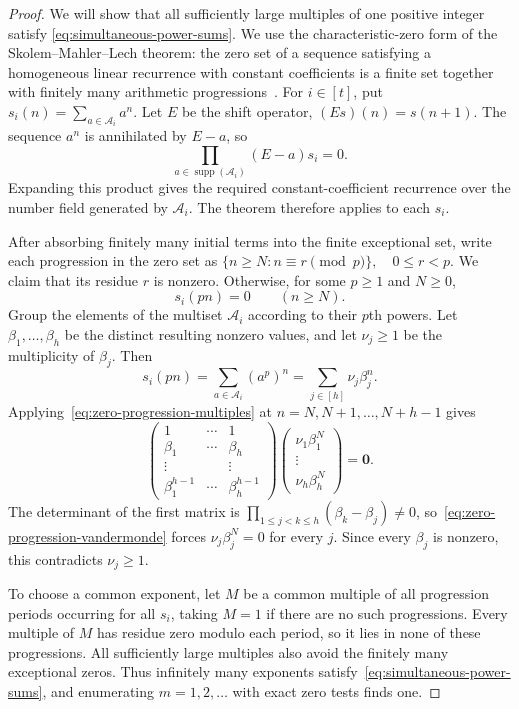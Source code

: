 \documentclass[11pt,letterpaper,onecolumn]{article}
\theoremstyle{plain}
\theoremstyle{definition}
\theoremstyle{remark}
\begin{document}
\begin{proof}
We will show that all sufficiently large multiples of one positive integer
satisfy \eqref{eq:simultaneous-power-sums}.
We use the characteristic-zero form of the Skolem--Mahler--Lech
theorem: the zero set of a sequence satisfying a homogeneous linear
recurrence with constant coefficients is a finite set together with
finitely many arithmetic progressions~\cite{Lech1953}.
For $i\in[t]$, put $s_i(n)=\sum_{a\in\mathcal A_i}a^n$.
Let $E$ be the shift operator, $(Es)(n)=s(n+1)$.  The sequence $a^n$
is annihilated by $E-a$, so
\[
 \prod_{a\in\operatorname{supp}(\mathcal A_i)}(E-a)s_i=0.
\]
Expanding this product gives the required constant-coefficient recurrence
over the number field generated by $\mathcal A_i$.  The theorem therefore
applies to each $s_i$.

After absorbing finitely many initial terms into the finite exceptional
set, write each progression in the zero set as
$\{n\ge N:n\equiv r\pmod p\}, \quad 0\le r<p$.
We claim that its residue $r$ is nonzero.  Otherwise, for some $p\ge1$
and $N\ge0$,
\begin{equation}
  s_i(pn)=0
  \qquad(n\ge N).
  \label{eq:zero-progression-multiples}
\end{equation}
Group the elements of the multiset $\mathcal A_i$ according to their $p$th
powers.  Let $\beta_1,\ldots,\beta_h$ be the distinct resulting nonzero
values, and let $\nu_j\ge1$ be the multiplicity of $\beta_j$.  Then
\[
  s_i(pn)
  =\sum_{a\in\mathcal A_i}(a^p)^n
  =\sum_{j\in[h]}\nu_j\beta_j^n.
\]
Applying~\eqref{eq:zero-progression-multiples} at
$n=N,N+1,\ldots,N+h-1$ gives
\begin{equation}
  \begin{pmatrix}
    1&\cdots&1\\
    \beta_1&\cdots&\beta_h\\
    \vdots&&\vdots\\
    \beta_1^{h-1}&\cdots&\beta_h^{h-1}
  \end{pmatrix}
  \begin{pmatrix}
    \nu_1\beta_1^N\\
    \vdots\\
    \nu_h\beta_h^N
  \end{pmatrix}
  =\mathbf0.
  \label{eq:zero-progression-vandermonde}
\end{equation}
The determinant of the first matrix is $\prod_{1\le j<k\le h}(\beta_k-\beta_j)\ne0$, so~\eqref{eq:zero-progression-vandermonde} forces
$\nu_j\beta_j^N=0$ for every $j$.  Since every $\beta_j$ is nonzero, this
contradicts $\nu_j\ge1$.

To choose a common exponent, let $M$ be a common multiple of all
progression periods occurring for all $s_i$, taking $M=1$ if there are
no such progressions.  Every multiple of $M$ has residue zero modulo
each period, so it lies in none of these progressions.  All sufficiently
large multiples also avoid the finitely many exceptional zeros.
Thus infinitely many exponents satisfy~\eqref{eq:simultaneous-power-sums},
and enumerating $m=1,2,\ldots$ with exact zero tests finds one.
\end{proof}
\end{document}

